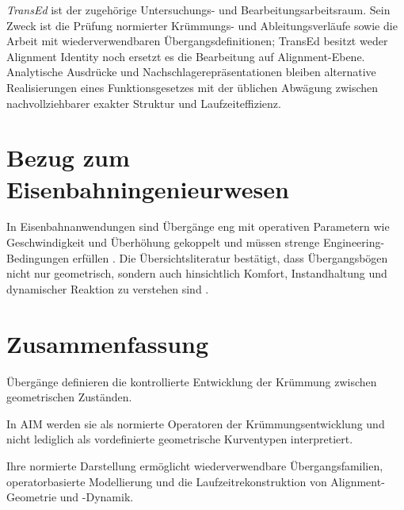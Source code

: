 \emph{TransEd} ist der zugehörige Untersuchungs- und Bearbeitungsarbeitsraum.
Sein Zweck ist die Prüfung normierter Krümmungs- und Ableitungsverläufe sowie
die Arbeit mit wiederverwendbaren Übergangsdefinitionen; TransEd besitzt weder
Alignment Identity noch ersetzt es die Bearbeitung auf Alignment-Ebene.
Analytische Ausdrücke und Nachschlagerepräsentationen bleiben alternative
Realisierungen eines Funktionsgesetzes mit der üblichen Abwägung zwischen
nachvollziehbarer exakter Struktur und Laufzeiteffizienz.

\section{Bezug zum Eisenbahningenieurwesen}
In Eisenbahnanwendungen sind Übergänge eng mit operativen Parametern wie
Geschwindigkeit und Überhöhung gekoppelt und müssen strenge
Engineering-Bedingungen erfüllen
\cite{Kufver2000RailwayAlignment,Klein1998Trassierung}.
Die Übersichtsliteratur bestätigt, dass Übergangsbögen nicht nur geometrisch,
sondern auch hinsichtlich Komfort, Instandhaltung und dynamischer Reaktion zu
verstehen sind \cite{BrustadDalmo2020Review}.

\section{Zusammenfassung}
\begin{summary}
Übergänge definieren die kontrollierte Entwicklung der Krümmung zwischen
geometrischen Zuständen.

In AIM werden sie als normierte Operatoren der Krümmungsentwicklung und nicht
lediglich als vordefinierte geometrische Kurventypen interpretiert.

Ihre normierte Darstellung ermöglicht wiederverwendbare Übergangsfamilien,
operatorbasierte Modellierung und die Laufzeitrekonstruktion von
Alignment-Geometrie und -Dynamik.
\end{summary}
